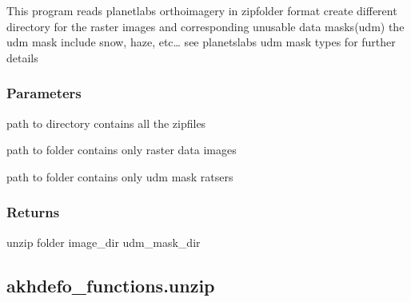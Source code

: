 \documentclass[letterpaper,10pt]{sphinxmanual}
\begin{document}
\begin{fulllineitems}
\label{\detokenize{generated/akhdefo_functions.read_data_prep:akhdefo_functions.read_data_prep}}
\pysigstartsignatures
{}
\pysigstopsignatures
\sphinxAtStartPar
This program reads planetlabs orthoimagery in zipfolder format
create different directory for the raster images and corresponding unusable data masks(udm)
the udm mask include snow, haze, etc… see planetslabs udm mask types for further details


\subsubsection{Parameters}
\label{\detokenize{generated/akhdefo_functions.read_data_prep:parameters}}\begin{description}
\sphinxAtStartPar
path to directory contains all the zipfiles

\sphinxAtStartPar
path to folder contains only raster data images

\sphinxAtStartPar
path to folder contains only udm mask ratsers

\end{description}


\subsubsection{Returns}
\label{\detokenize{generated/akhdefo_functions.read_data_prep:returns}}
\sphinxAtStartPar
unzip folder
image\_dir
udm\_mask\_dir

\end{fulllineitems}


\sphinxstepscope


\subsection{akhdefo\_functions.unzip}
\label{\detokenize{generated/akhdefo_functions.unzip:akhdefo-functions-unzip}}\label{\detokenize{generated/akhdefo_functions.unzip::doc}}
\end{document}
